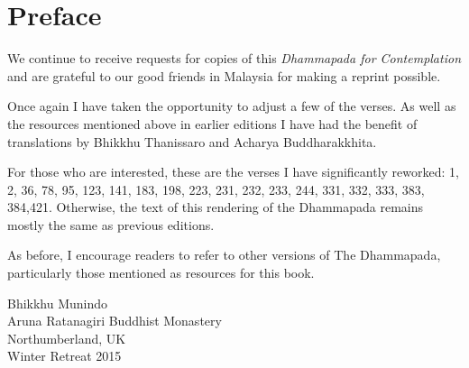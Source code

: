 
\chapter[Preface to the fourth edition (2015)]{Preface}

We continue to receive requests for copies of this \emph{Dhammapada for Contemplation} and are grateful to our good friends in Malaysia for making a reprint possible.

Once again I have taken the opportunity to adjust a few of the verses. As well as the resources mentioned above in earlier editions I have had the benefit of translations by Bhikkhu Thanissaro and Acharya Buddharakkhita.


For those who are interested, these are the verses I have significantly reworked: 1, 2, 36, 78, 95, 123, 141, 183, 198, 223, 231, 232, 233, 244, 331, 332, 333, 383, 384,421. Otherwise, the text of this rendering of the Dhammapada remains mostly the same as previous editions.

As before, I encourage readers to refer to other versions of The Dhammapada, particularly those mentioned as resources for this book.

{\raggedleft
Bhikkhu Munindo\\
Aruna Ratanagiri Buddhist Monastery\\
Northumberland, UK\\
Winter Retreat 2015
\par}
